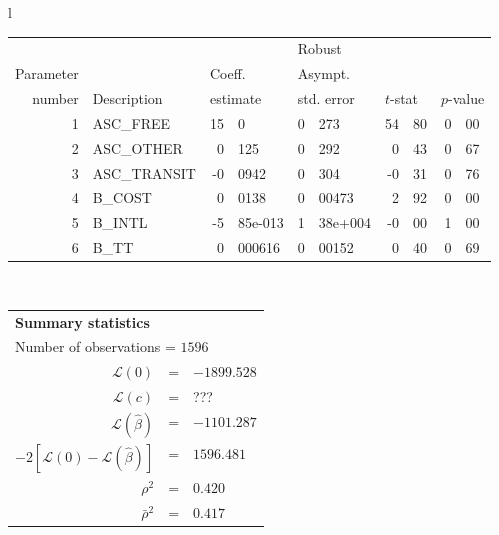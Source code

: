   \begin{tabular}{l}
\begin{tabular}{rlr@{.}lr@{.}lr@{.}lr@{.}l}
         &                       &   \multicolumn{2}{l}{}    & \multicolumn{2}{l}{Robust}  &     \multicolumn{4}{l}{}   \\
Parameter &                       &   \multicolumn{2}{l}{Coeff.}      & \multicolumn{2}{l}{Asympt.}  &     \multicolumn{4}{l}{}   \\
number &  Description                     &   \multicolumn{2}{l}{estimate}      & \multicolumn{2}{l}{std. error}  &   \multicolumn{2}{l}{$t$-stat}  &   \multicolumn{2}{l}{$p$-value}   \\

\hline

1 & ASC\_FREE & 15&0 & 0&273 & 54&80 & 0&00 \\
2 & ASC\_OTHER & 0&125 & 0&292 & 0&43 & 0&67 \\
3 & ASC\_TRANSIT & -0&0942 & 0&304 & -0&31 & 0&76 \\
4 & B\_COST & 0&0138 & 0&00473 & 2&92 & 0&00 \\
5 & B\_INTL & -5&85e-013 & 1&38e+004 & -0&00 & 1&00 \\
6 & B\_TT & 0&000616 & 0&00152 & 0&40 & 0&69 \\
\hline

\end{tabular}
\\
\begin{tabular}{rcl}
\multicolumn{3}{l}{\bf Summary statistics}\\
\multicolumn{3}{l}{ Number of observations = $1596$} \\
 $\mathcal{L}(0)$ &=&  $-1899.528$ \\
 $\mathcal{L}(c)$ &=& ???\\
 $\mathcal{L}(\hat{\beta})$ &=& $-1101.287 $  \\
 $-2[\mathcal{L}(0) -\mathcal{L}(\hat{\beta})]$ &=& $1596.481$ \\
    $\rho^2$ &=&   $0.420$ \\
    $\bar{\rho}^2$ &=&    $0.417$ \\
\end{tabular}
\end{tabular}

